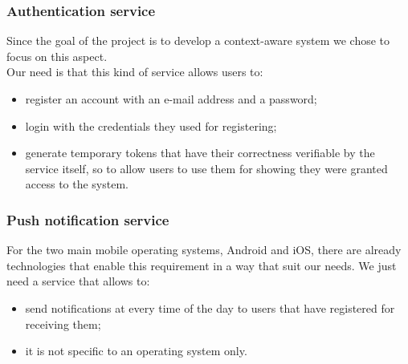 \documentclass[../../main]{subfiles}
\begin{document}
\subsubsection{Authentication service}
Since the goal of the project is to develop a context-aware system we chose to focus on this aspect.
\\Our need is that this kind of service allows users to:
\begin{itemize}
    \item register an account with an e-mail address and a password;
    \item login with the credentials they used for registering;
    \item generate temporary tokens that have their correctness verifiable by the service itself, so to allow users to use them for showing they were granted access to the system.
\end{itemize}

\subsubsection{Push notification service}
For the two main mobile operating systems, Android and iOS, there are already technologies that enable this requirement in a way that suit our needs.
We just need a service that allows to:
\begin{itemize}
    \item send notifications at every time of the day to users that have registered for receiving them;
    \item it is not specific to an operating system only.
\end{itemize}
\end{document}
